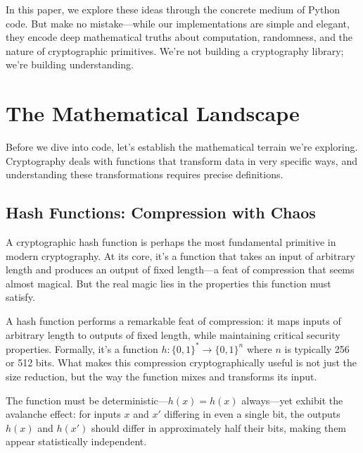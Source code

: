 \documentclass[11pt]{article}
\begin{document}
In this paper, we explore these ideas through the concrete medium of Python code. But make no mistake---while our implementations are simple and elegant, they encode deep mathematical truths about computation, randomness, and the nature of cryptographic primitives. We're not building a cryptography library; we're building understanding.

\section{The Mathematical Landscape}

Before we dive into code, let's establish the mathematical terrain we're exploring. Cryptography deals with functions that transform data in very specific ways, and understanding these transformations requires precise definitions.

\subsection{Hash Functions: Compression with Chaos}

A cryptographic hash function is perhaps the most fundamental primitive in modern cryptography. At its core, it's a function that takes an input of arbitrary length and produces an output of fixed length---a feat of compression that seems almost magical. But the real magic lies in the properties this function must satisfy.

A hash function performs a remarkable feat of compression: it maps inputs of arbitrary length to outputs of fixed length, while maintaining critical security properties. Formally, it's a function $h: \{0,1\}^* \to \{0,1\}^n$ where $n$ is typically 256 or 512 bits. What makes this compression cryptographically useful is not just the size reduction, but the way the function mixes and transforms its input.

The function must be deterministic---$h(x) = h(x)$ always---yet exhibit the avalanche effect: for inputs $x$ and $x'$ differing in even a single bit, the outputs $h(x)$ and $h(x')$ should differ in approximately half their bits, making them appear statistically independent.
\end{document}

